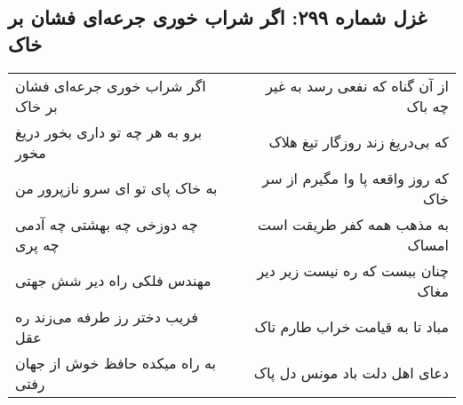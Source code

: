 \begin{center}
\section*{غزل شماره ۲۹۹: اگر شراب خوری جرعه‌ای فشان بر خاک}
\label{sec:sh299}
\begin{longtable}{l p{0.5cm} r}
اگر شراب خوری جرعه‌ای فشان بر خاک
&&
از آن گناه که نفعی رسد به غیر چه باک
\\
برو به هر چه تو داری بخور دریغ مخور
&&
که بی‌دریغ زند روزگار تیغ هلاک
\\
به خاک پای تو ای سرو نازپرور من
&&
که روز واقعه پا وا مگیرم از سر خاک
\\
چه دوزخی چه بهشتی چه آدمی چه پری
&&
به مذهب همه کفر طریقت است امساک
\\
مهندس فلکی راه دیر شش جهتی
&&
چنان ببست که ره نیست زیر دیر مغاک
\\
فریب دختر رز طرفه می‌زند ره عقل
&&
مباد تا به قیامت خراب طارم تاک
\\
به راه میکده حافظ خوش از جهان رفتی
&&
دعای اهل دلت باد مونس دل پاک
\\
\end{longtable}
\end{center}
